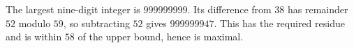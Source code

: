 The largest nine-digit integer is $999999999$. Its difference from $38$ has remainder $52$ modulo $59$, so subtracting $52$ gives $\boxed{999999947}$. This has the required residue and is within $58$ of the upper bound, hence is maximal.
